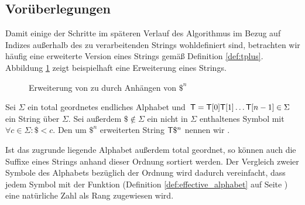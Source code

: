 \subsection{Vorüberlegungen}
\label{bpr:vorueberlegungen}

Damit einige der Schritte im späteren Verlauf des Algorithmus im Bezug auf Indizes außerhalb des zu verarbeitenden Strings wohldefiniert sind, betrachten wir häufig eine erweiterte Version eines Strings gemäß Definition \ref{def:tplus}. Abbildung \ref{fig:tplus} zeigt beispielhaft eine Erweiterung eines Strings.

\begin{figure}[ht]
	\caption{Erweiterung von  zu  durch Anhängen von \(\$^n\)}
	\label{fig:tplus}
\end{figure}

\begin{definition}[\inputtextplus]
	\label{def:tplus}
    Sei \(\Sigma\) ein total geordnetes endliches Alphabet und \(\inputtext = \inputtext[0] \inputtext[1] \ldots \inputtext[n-1] \in \Sigma\) ein String über \(\Sigma\). Sei außerdem \(\$ \notin \Sigma\) ein nicht in \(\Sigma\) enthaltenes Symbol mit \(\forall c \in \Sigma : \$ < c\). Den um \(\$^n\) erweiterten String \(\inputtext\$^n\) nennen wir .
\end{definition}

Ist das zugrunde liegende Alphabet außerdem total geordnet, so können auch die Suffixe eines Strings anhand dieser Ordnung sortiert werden.
Der Vergleich zweier Symbole des Alphabets bezüglich der Ordnung wird dadurch vereinfacht, dass jedem Symbol mit der Funktion \effective (Definition \ref{def:effective_alphabet} auf Seite \pageref{def:effective_alphabet}) eine natürliche Zahl als Rang zugewiesen wird.

